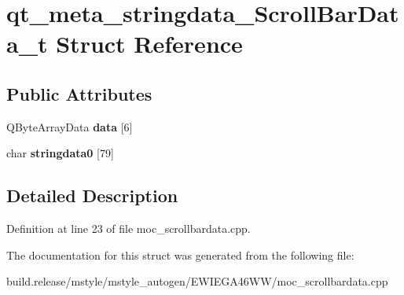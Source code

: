 \hypertarget{structqt__meta__stringdata___scroll_bar_data__t}{}\section{qt\+\_\+meta\+\_\+stringdata\+\_\+\+Scroll\+Bar\+Data\+\_\+t Struct Reference}
\label{structqt__meta__stringdata___scroll_bar_data__t}
\subsection*{Public Attributes}
\begin{DoxyCompactItemize}
\item 
\mbox{\label{structqt__meta__stringdata___scroll_bar_data__t_aec52055012035ffe444c58f60da47c26}} 
Q\+Byte\+Array\+Data {\bfseries data} \mbox{[}6\mbox{]}
\item 
\mbox{\label{structqt__meta__stringdata___scroll_bar_data__t_aa31ae8b46f51de36be3c27554f223b57}} 
char {\bfseries stringdata0} \mbox{[}79\mbox{]}
\end{DoxyCompactItemize}


\subsection{Detailed Description}


Definition at line 23 of file moc\+\_\+scrollbardata.\+cpp.



The documentation for this struct was generated from the following file\+:\begin{DoxyCompactItemize}
\item 
build.\+release/mstyle/mstyle\+\_\+autogen/\+E\+W\+I\+E\+G\+A46\+W\+W/moc\+\_\+scrollbardata.\+cpp\end{DoxyCompactItemize}
